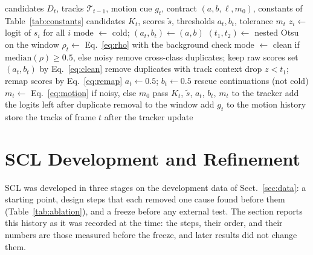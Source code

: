 \documentclass[pdflatex,sn-mathphys-num,iicol]{sn-jnl}
\newcommand{\scl}{SCL}
\begin{document}
\begin{algorithm}[t]
\caption{\scl{} for frame $t$; the comments name the steps of Fig.~\ref{fig:arch}. The window
holds the logits of frames $t-W$ to $t-1$, so the decision for frame $t$ uses no future frame.}\label{alg:layer}
\begin{algorithmic}[1]
\Require candidates $D_t$, tracks $\mathcal{T}_{t-1}$, motion cue $g_t$, contract $(a,b,\ell,m_0)$, constants of Table~\ref{tab:constants}
\Ensure candidates $K_t$, scores $\tilde{s}$, thresholds $a_t,b_t$, tolerance $m_t$
\State $z_i\gets$ logit of $s_i$ for all $i$ 
 
  \State mode $\gets$ cold; $(a_t,b_t)\gets(a,b)$
\Else
  \State $(t_1,t_2)\gets$ nested Otsu on the window 
  \State $\rho_t\gets$ Eq.~\eqref{eq:rho} with the background check
  \State mode $\gets$ clean if $\mathrm{median}(\rho)\ge0.5$, else noisy 
\EndIf
{} 
  \State remove cross-class duplicates; keep raw scores
   set $(a_t,b_t)$ by Eq.~\eqref{eq:clean}
  \EndIf
\Else {}
  \State remove duplicates with track context
  \State drop $z<t_1$; remap scores by Eq.~\eqref{eq:remap}
  \State $a_t\gets0.5$; $b_t\gets0.5$
\EndIf
\State rescue continuations (not cold) 
\State $m_t\gets$ Eq.~\eqref{eq:motion} if noisy, else $m_0$ 
\State pass $K_t$, $\tilde{s}$, $a_t$, $b_t$, $m_t$ to the tracker
\State add the logits left after duplicate removal to the window
\State add $g_t$ to the motion history
\State store the tracks of frame $t$ after the tracker update
\end{algorithmic}
\end{algorithm}
\section{SCL Development and Refinement}\label{sec:development}

\scl{} was developed in three stages on the development data of Sect.~\ref{sec:data}: a starting
point, design steps that each removed one cause found before them (Table~\ref{tab:ablation}), and a
freeze before any external test. The section reports this history as it was recorded at the time:
the steps, their order, and their numbers are those measured before the freeze, and later results
did not change them.
\end{document}
